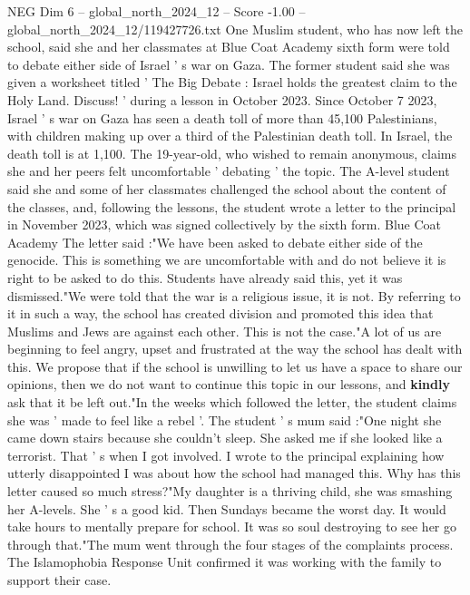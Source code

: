 \begin{textsample}{NEG Dim 6 – global\_north\_2024\_12 – Score -1.00 – global\_north\_2024\_12/119427726.txt}  \label{ex:f6_neg_189}
One Muslim student, who has now left the school, said she and her classmates at Blue Coat Academy sixth form were told to debate either side of Israel ' s war on Gaza.
The former student said she was given a worksheet titled ' The Big Debate : Israel holds the greatest claim to the Holy Land.
Discuss! ' during a lesson in October 2023.
Since October 7 2023, Israel ' s war on Gaza has seen a death toll of more than 45,100 Palestinians, with children making up over a third of the Palestinian death toll.
In Israel, the death toll is at 1,100.
The 19-year-old, who wished to remain anonymous, claims she and her peers felt uncomfortable ' debating ' the topic.
The A-level student said she and some of her classmates challenged the school about the content of the classes, and, following the lessons, the student wrote a letter to the principal in November 2023, which was signed collectively by the sixth form.
Blue Coat Academy The letter said :"We have been asked to debate either side of the genocide.
This is something we are uncomfortable with and do not believe it is right to be asked to do this.
Students have already said this, yet it was dismissed."We were told that the war is a religious issue, it is not.
By referring to it in such a way, the school has created division and promoted this idea that Muslims and Jews are against each other.
This is not the case."A lot of us are beginning to feel angry, upset and frustrated at the way the school has dealt with this.
We propose that if the school is unwilling to let us have a space to share our opinions, then we do not want to continue this topic in our lessons, and \textbf{kindly} ask that it be left out."In the weeks which followed the letter, the student claims she was ' made to feel like a rebel '.
The student ' s mum said :"One night she came down stairs because she couldn't sleep.
She asked me if she looked like a terrorist.
That ' s when I got involved.
I wrote to the principal explaining how utterly disappointed I was about how the school had managed this.
Why has this letter caused so much stress?"My daughter is a thriving child, she was smashing her A-levels.
She ' s a good kid.
Then Sundays became the worst day.
It would take hours to mentally prepare for school.
It was so soul destroying to see her go through that."The mum went through the four stages of the complaints process.
The Islamophobia Response Unit confirmed it was working with the family to support their case.

\end{textsample}
